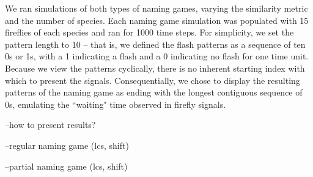 
We ran simulations of both types of naming games, varying the similarity metric and the number of species.
Each naming game simulation was populated with 15 fireflies of each species and ran for 1000 time steps. 
For simplicity, we set the pattern length to 10 -- that is, we defined the flash patterns as a sequence of ten 0s or 1s, with a 1 indicating a flash and a 0 indicating no flash for one time unit. 
Because we view the patterns cyclically, there is no inherent starting index with which to present the signals. 
Consequentially, we chose to display the resulting patterns of the naming game as ending with the longest contiguous sequence of 0s, emulating the ``waiting" time observed in firefly signals. 


--how to present results? 

--regular naming game (lcs, shift)


--partial naming game (lcs, shift)
 